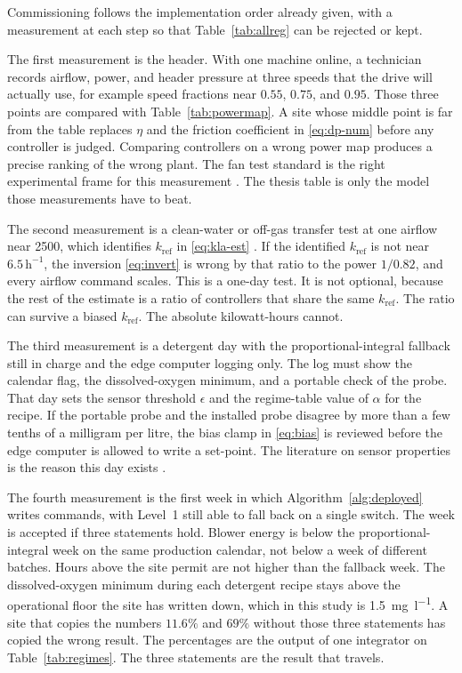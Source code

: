 Commissioning follows the implementation order already given, with a measurement at each step so that Table~\ref{tab:allreg} can be rejected or kept.

The first measurement is the header. With one machine online, a technician records airflow, power, and header pressure at three speeds that the drive will actually use, for example speed fractions near $0.55$, $0.75$, and $0.95$. Those three points are compared with Table~\ref{tab:powermap}. A site whose middle point is far from the table replaces $\eta$ and the friction coefficient in \eqref{eq:dp-num} before any controller is judged. Comparing controllers on a wrong power map produces a precise ranking of the wrong plant. The fan test standard is the right experimental frame for this measurement \cite{amca210,dixon2014turbo,iec60034}. The thesis table is only the model those measurements have to beat.

The second measurement is a clean-water or off-gas transfer test at one airflow near \SI{2500}{\nmcph}, which identifies $k_{\mathrm{ref}}$ in \eqref{eq:kla-est} \cite{asce2007oxygen,gillot2005,redmon1983}. If the identified $k_{\mathrm{ref}}$ is not near $6.5\,\mathrm{h^{-1}}$, the inversion \eqref{eq:invert} is wrong by that ratio to the power $1/0.82$, and every airflow command scales. This is a one-day test. It is not optional, because the rest of the estimate is a ratio of controllers that share the same $k_{\mathrm{ref}}$. The ratio can survive a biased $k_{\mathrm{ref}}$. The absolute kilowatt-hours cannot.

The third measurement is a detergent day with the proportional-integral fallback still in charge and the edge computer logging only. The log must show the calendar flag, the dissolved-oxygen minimum, and a portable check of the probe. That day sets the sensor threshold $\epsilon$ and the regime-table value of $\alpha$ for the recipe. If the portable probe and the installed probe disagree by more than a few tenths of a milligram per litre, the bias clamp in \eqref{eq:bias} is reviewed before the edge computer is allowed to write a set-point. The literature on sensor properties is the reason this day exists \cite{rieger2003sensors,olsson2012ica,haimi2013soft}.

The fourth measurement is the first week in which Algorithm~\ref{alg:deployed} writes commands, with Level~1 still able to fall back on a single switch. The week is accepted if three statements hold. Blower energy is below the proportional-integral week on the same production calendar, not below a week of different batches. Hours above the site permit are not higher than the fallback week. The dissolved-oxygen minimum during each detergent recipe stays above the operational floor the site has written down, which in this study is \SI{1.5}{\milli\gram\per\litre}. A site that copies the numbers $11.6\%$ and $69\%$ without those three statements has copied the wrong result. The percentages are the output of one integrator on Table~\ref{tab:regimes}. The three statements are the result that travels.

